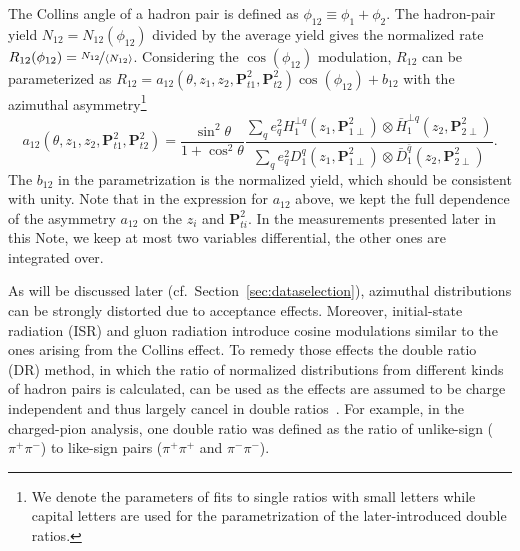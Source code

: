 The Collins angle of a hadron pair is defined as $\phi_{12} \equiv \phi_1+\phi_2$. The hadron-pair yield $N_{12}=N_{12}(\phi_{12})$ divided by the average yield gives the normalized rate $R_{12}(\phi_{12})=\nicefrac{N_{12}}{\langle  N_{12}\rangle}$. Considering the $\cos(\phi_{12})$ modulation, $R_{12}$ can be parameterized as $R_{12}=a_{12}(\theta,z_1,z_2, \boldsymbol{P}^2_{t1},\boldsymbol{P}^2_{t2})\cos(\phi_{12})+b_{12}$ with the azimuthal asymmetry\footnote{We denote the parameters of fits to single ratios with small letters while capital letters are used for the parametrization of the later-introduced double ratios.}
\begin{equation}
a_{12}(\theta,z_1,z_2, \boldsymbol{P}^2_{t1},\boldsymbol{P}^2_{t2})=\frac{\sin^2\theta}{1+\cos^2\theta}
\frac{\sum\limits_{q}e^2_qH^{\bot q}_1(z_1,\boldsymbol{P}^2_{1\perp})\otimes \bar{H}^{\bot q}_1(z_2,\boldsymbol{P}^2_{2\perp})}{\sum\limits_{q}e^2_qD^q_1(z_1,\boldsymbol{P}^2_{1\perp})\otimes \bar{D}^{\bar{q}}_1(z_2,\boldsymbol{P}^2_{2\perp})}.
\end{equation} 
The $b_{12}$ in the parametrization is the normalized yield, which should be consistent with unity.
Note that in the expression for $a_{12}$ above, we kept the full dependence of the asymmetry $a_{12}$ on the $z_i$ and $ \boldsymbol{P}^2_{ti}$. In the measurements presented later in this Note, we keep at most two variables differential, the other ones are integrated over.

As will be discussed later (cf.~Section~\ref{sec:dataselection}),  azimuthal distributions can be strongly distorted due to acceptance effects. Moreover, initial-state radiation (ISR) and gluon radiation introduce cosine modulations similar to the ones arising from the Collins effect. To remedy those effects the double ratio (DR) method, in which the ratio of normalized distributions from different kinds of hadron pairs is calculated, can be used as the effects are assumed to be charge independent and thus largely cancel in double ratios~\cite{ChargedPionResult,CollinsInSIDISandEE}.  For example, in the charged-pion analysis, one double ratio was defined as the ratio of unlike-sign  ($\pi^+\pi^-$) to like-sign pairs ($\pi^+\pi^+$ and $\pi^-\pi^-$).


